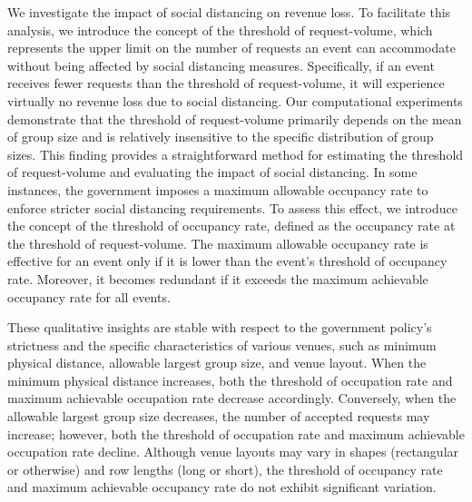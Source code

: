 We investigate the impact of social distancing on revenue loss. To facilitate this analysis, we introduce the concept of the threshold of request-volume, which represents the upper limit on the number of requests an event can accommodate without being affected by social distancing measures. Specifically, if an event receives fewer requests than the threshold of request-volume, it will experience virtually no revenue loss due to social distancing. Our computational experiments demonstrate that the threshold of request-volume primarily depends on the mean of group size and is relatively insensitive to the specific distribution of group sizes. This finding provides a straightforward method for estimating the threshold of request-volume and evaluating the impact of social distancing.
In some instances, the government imposes a maximum allowable occupancy rate to enforce stricter social distancing requirements. To assess this effect, we introduce the concept of the threshold of occupancy rate, defined as the occupancy rate at the threshold of request-volume. The maximum allowable occupancy rate is effective for an event only if it is lower than the event's threshold of occupancy rate. Moreover, it becomes redundant if it exceeds the maximum achievable occupancy rate for all events.




These qualitative insights are stable with respect to the government policy's strictness and the specific characteristics of various venues, such as minimum physical distance, allowable largest group size, and venue layout. When the minimum physical distance increases, both the threshold of occupation rate and maximum achievable occupation rate decrease accordingly. Conversely, when the allowable largest group size decreases, the number of accepted requests may increase; however, both the threshold of occupation rate and maximum achievable occupation rate decline. Although venue layouts may vary in shapes (rectangular or otherwise) and row lengths (long or short), the threshold of occupancy rate and maximum achievable occupancy rate do not exhibit significant variation.


